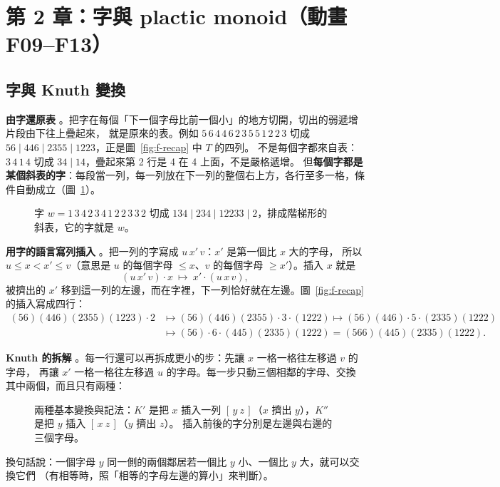 \section{第 2 章：字與 plactic monoid（動畫 F09--F13）}\label{sec:f-ch2}

\subsection{字與 Knuth 變換}\label{sec:f-knuth}

\textbf{由字還原表} 。把字在每個「下一個字母比前一個小」的地方切開，切出的弱遞增片段由下往上疊起來，
就是原來的表。例如 $5\,6\,4\,4\,6\,2\,3\,5\,5\,1\,2\,2\,3$ 切成 $56\mid 446\mid 2355\mid 1223$，正是圖~\ref{fig:f-recap} 中 $T$ 的四列。
不是每個字都來自表：$3\,4\,1\,4$ 切成 $34\mid 14$，疊起來第 2 行是 4 在 4 上面，不是嚴格遞增。
但\textbf{每個字都是某個斜表的字}：每段當一列，每一列放在下一列的整個右上方，各行至多一格，條件自動成立（圖~\ref{fig:f-runs}）。

\begin{figure}[H]
\centering
\FulRuns
\caption{字 $w=1\,3\,4\,2\,3\,4\,1\,2\,2\,3\,3\,2$ 切成 $134\mid 234\mid 12233\mid 2$，排成階梯形的斜表，它的字就是 $w$。}
\label{fig:f-runs}
\end{figure}

\textbf{用字的語言寫列插入} 。把一列的字寫成 $u\,x'\,v$：$x'$ 是第一個比 $x$ 大的字母，
所以 $u\le x<x'\le v$（意思是 $u$ 的每個字母 $\le x$、$v$ 的每個字母 $\ge x'$）。插入 $x$ 就是
\[
(u\,x'\,v)\cdot x\ \longmapsto\ x'\cdot(u\,x\,v),
\]
被擠出的 $x'$ 移到這一列的左邊，而在字裡，下一列恰好就在左邊。圖~\ref{fig:f-recap} 的插入寫成四行：
\[
\begin{aligned}
(56)(446)(2355)(1223)\cdot 2&\mapsto(56)(446)(2355)\cdot 3\cdot(1222)\mapsto(56)(446)\cdot 5\cdot(2335)(1222)\\
&\mapsto(56)\cdot 6\cdot(445)(2335)(1222)=(566)(445)(2335)(1222).
\end{aligned}
\]

\textbf{Knuth 的拆解} 。每一行還可以再拆成更小的步：先讓 $x$ 一格一格往左移過 $v$ 的字母，
再讓 $x'$ 一格一格往左移過 $u$ 的字母。每一步只動三個相鄰的字母、交換其中兩個，而且只有兩種：
\begin{figure}[H]
\centering
\FulKnuthRules
\caption{兩種基本變換與記法：$K'$ 是把 $x$ 插入一列 $[\,y\ z\,]$（$x$ 擠出 $y$），$K''$ 是把 $y$ 插入 $[\,x\ z\,]$（$y$ 擠出 $z$）。
插入前後的字分別是左邊與右邊的三個字母。}
\label{fig:f-knuth-rules}
\end{figure}
換句話說：一個字母 $y$ 同一側的兩個鄰居若一個比 $y$ 小、一個比 $y$ 大，就可以交換它們
（有相等時，照「相等的字母左邊的算小」來判斷）。

